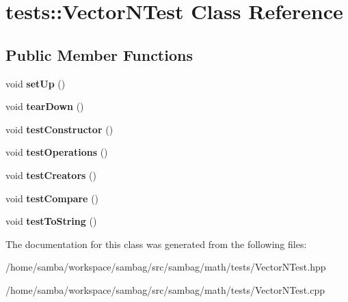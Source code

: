 \hypertarget{classtests_1_1_vector_n_test}{
\section{tests::VectorNTest Class Reference}
\label{classtests_1_1_vector_n_test}
}
\subsection*{Public Member Functions}
\begin{DoxyCompactItemize}
\item 
\hypertarget{classtests_1_1_vector_n_test_a6d87bb8a36581dd71dcad6e0c2639b29}{
void {\bfseries setUp} ()}
\label{classtests_1_1_vector_n_test_a6d87bb8a36581dd71dcad6e0c2639b29}

\item 
\hypertarget{classtests_1_1_vector_n_test_adbe70c71fcdb9145888e51ee1b36f08e}{
void {\bfseries tearDown} ()}
\label{classtests_1_1_vector_n_test_adbe70c71fcdb9145888e51ee1b36f08e}

\item 
\hypertarget{classtests_1_1_vector_n_test_a11ba6a650e87cf7bd49a1c1244bc23e7}{
void {\bfseries testConstructor} ()}
\label{classtests_1_1_vector_n_test_a11ba6a650e87cf7bd49a1c1244bc23e7}

\item 
\hypertarget{classtests_1_1_vector_n_test_a8e76f08d9d07979e1e46df637bcf0dd4}{
void {\bfseries testOperations} ()}
\label{classtests_1_1_vector_n_test_a8e76f08d9d07979e1e46df637bcf0dd4}

\item 
\hypertarget{classtests_1_1_vector_n_test_a7cda2c6814d2afc3b2fd5c77ca4459a6}{
void {\bfseries testCreators} ()}
\label{classtests_1_1_vector_n_test_a7cda2c6814d2afc3b2fd5c77ca4459a6}

\item 
\hypertarget{classtests_1_1_vector_n_test_ae29dec57e9ebb03cabd80a41ceccb6fb}{
void {\bfseries testCompare} ()}
\label{classtests_1_1_vector_n_test_ae29dec57e9ebb03cabd80a41ceccb6fb}

\item 
\hypertarget{classtests_1_1_vector_n_test_a1ce59a9193a7991de0434f1ba554dc55}{
void {\bfseries testToString} ()}
\label{classtests_1_1_vector_n_test_a1ce59a9193a7991de0434f1ba554dc55}

\end{DoxyCompactItemize}


The documentation for this class was generated from the following files:\begin{DoxyCompactItemize}
\item 
/home/samba/workspace/sambag/src/sambag/math/tests/VectorNTest.hpp\item 
/home/samba/workspace/sambag/src/sambag/math/tests/VectorNTest.cpp\end{DoxyCompactItemize}

